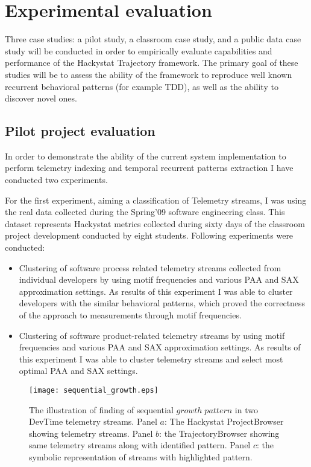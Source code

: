 \chapter{Experimental evaluation} \label{experiments}
Three case studies: a pilot study, a classroom case study, and a public data case study will be conducted in order to empirically evaluate capabilities and performance of the Hackystat Trajectory framework. The primary goal of these studies will be to assess the ability of the framework to reproduce well known recurrent behavioral patterns (for example TDD), as well as the ability to discover novel ones.

\section{Pilot project evaluation}
In order to demonstrate the ability of the current system implementation to perform telemetry indexing and temporal recurrent patterns extraction I have conducted two experiments. 

For the first experiment, aiming a classification of Telemetry streams, I was using the real data collected during the Spring'09 software engineering class. This dataset represents Hackystat metrics collected during sixty days of the classroom project development conducted by eight students. Following experiments were conducted:
\begin{itemize}
	\item Clustering of software process related telemetry streams collected from individual developers by using motif frequencies and various PAA and SAX approximation settings. As results of this experiment I was able to cluster developers with the similar behavioral patterns, which proved the correctness of the approach to measurements through motif frequencies.
	\item Clustering of software product-related telemetry streams by using motif frequencies and various PAA and SAX approximation settings. As results of this experiment I was able to cluster telemetry streams and select most optimal PAA and SAX settings.
\end{itemize}

\begin{figure}[tbp]
   \centering
   \texttt{[image: sequential\_growth.eps]}
   \caption{The illustration of finding of sequential $growth \; pattern$ in two DevTime telemetry streams. Panel $a$: The Hackystat ProjectBrowser showing telemetry streams. Panel $b$: the TrajectoryBrowser showing same telemetry streams along with identified pattern. Panel $c$: the symbolic representation of streams with highlighted pattern.}
   \label{fig:sequential_growth}
\end{figure}

